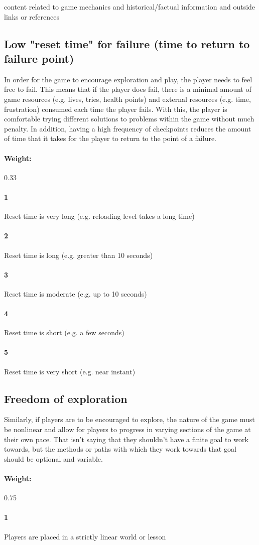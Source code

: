 content related to game mechanics and historical/factual information and outside links or references\subsection{Low "reset time" for failure (time to return to failure point)}{In order for the game to encourage exploration and play, the player needs to feel free to fail. This means that if the player does fail, there is a minimal amount of game resources (e.g. lives, tries, health points) and external resources (e.g. time, frustration) consumed each time the player fails. With this, the player is comfortable trying different solutions to problems within the game without much penalty. In addition, having a high frequency of checkpoints reduces the amount of time that it takes for the player to return to the point of a failure.} \paragraph{Weight:}{0.33}\paragraph{1}Reset time is very long (e.g. reloading level takes a long time)\paragraph{2}Reset time is long (e.g. greater than 10 seconds)\paragraph{3}Reset time is moderate (e.g. up to 10 seconds)\paragraph{4}Reset time is short (e.g. a few seconds)\paragraph{5}Reset time is very short (e.g. near instant)\subsection{Freedom of exploration}{Similarly, if players are to be encouraged to explore, the nature of the game must be nonlinear and allow for players to progress in varying sections of the game at their own pace. That isn't saying that they shouldn't have a finite goal to work towards, but the methods or paths with which they work towards that goal should be optional and variable.} \paragraph{Weight:}{0.75}\paragraph{1}Players are placed in a strictly linear world or lesson 